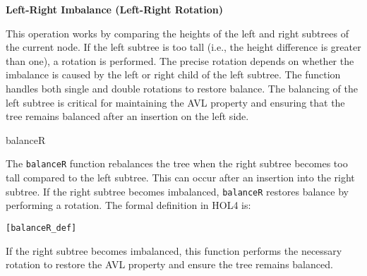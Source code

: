 \textbf{Left-Right Imbalance (Left-Right Rotation)}
\begin{center}
\end{center}
  
  This operation works by comparing the heights of the left and right subtrees of the current node. If the left subtree is too tall (i.e., the height difference is greater than one), a rotation is performed. The precise rotation depends on whether the imbalance is caused by the left or right child of the left subtree. The function handles both single and double rotations to restore balance. The balancing of the left subtree is critical for maintaining the AVL property and ensuring that the tree remains balanced after an insertion on the left side.

\begin{defn}{balanceR}

The \texttt{balanceR} function rebalances the tree when the right subtree becomes too tall compared to the left subtree. This can occur after an insertion into the right subtree. If the right subtree becomes imbalanced, \texttt{balanceR} restores balance by performing a rotation. The formal definition in HOL4 is:
\begin{alltt}
	[balanceR_def]
\end{alltt}

If the right subtree becomes imbalanced, this function performs the necessary rotation to restore the AVL property and ensure the tree remains balanced.
\end{defn}


